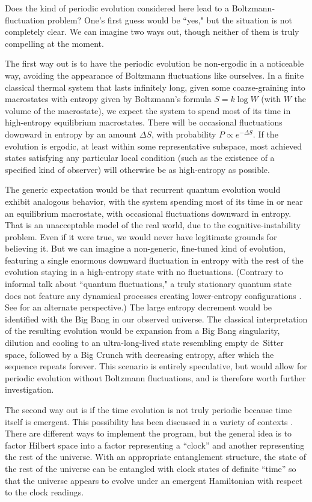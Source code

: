 \documentclass[aps,prd,twocolumn,nofootinbib,notitlepage]{revtex4-1}
\begin{document}
Does the kind of periodic evolution considered here lead to a Boltzmann-fluctuation problem?
One's first guess would be ``yes," but the situation is not completely clear.
We can imagine two ways out, though neither of them is truly compelling at the moment.

The first way out is to have the periodic evolution be non-ergodic in a noticeable way, avoiding the appearance of Boltzmann fluctuations like ourselves.
In a finite classical thermal system that lasts infinitely long, given some coarse-graining into macrostates with entropy given by Boltzmann's formula $S=k\log W$ (with $W$ the volume of the macrostate), we expect the system to spend most of its time in high-entropy equilibrium macrostates.
There will be occasional fluctuations downward in entropy by an amount $\Delta S$, with probability $P \propto e^{-\Delta S}$.
If the evolution is ergodic, at least within some representative subspace, most achieved states satisfying any particular local condition (such as the existence of a specified kind of observer) will otherwise be as high-entropy as possible. 

The generic expectation would be that recurrent quantum evolution would exhibit analogous behavior, with the system spending most of its time in or near an equilibrium macrostate, with occasional fluctuations downward in entropy.
That is an unacceptable model of the real world, due to the cognitive-instability problem.
Even if it were true, we would never have legitimate grounds for believing it.
But we can imagine a non-generic, fine-tuned kind of evolution, featuring a single enormous downward fluctuation in entropy with the rest of the evolution staying in a high-entropy state with no fluctuations.
(Contrary to informal talk about ``quantum fluctuations," a truly stationary quantum state does not feature any dynamical processes creating lower-entropy configurations \cite{Boddy_2016}. See \cite{Lloyd:2016ahu} for an alternate perspective.)
The large entropy decrement would be identified with the Big Bang in our observed universe.
The classical interpretation of the resulting evolution would be expansion from a Big Bang singularity, dilution and cooling to an ultra-long-lived state resembling empty de~Sitter space, followed by a Big Crunch with decreasing entropy, after which the sequence repeats forever.
This scenario is entirely speculative, but would allow for periodic evolution without Boltzmann fluctuations, and is therefore worth further investigation. 

The second way out is if the time evolution is not truly periodic because time itself is emergent.
This possibility has been discussed in a variety of contexts \cite{Page:1983uc,Banks:1984cw,Albrecht:2007mm,Rovelli:2009ee,Giovannetti:2015qha,Marletto:2016gwv,Singh:2020kdu}.
There are different ways to implement the program, but the general idea is to factor Hilbert space into a factor representing a ``clock'' and another representing the rest of the universe.
With an appropriate entanglement structure, the state of the rest of the universe can be entangled with clock states of definite ``time'' so that the universe appears to evolve under an emergent Hamiltonian with respect to the clock readings.
\end{document}
